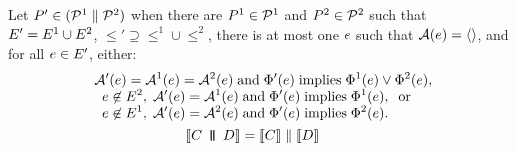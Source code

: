 \begin{definition}
  Let $P' \in (\mathcal{P}^1 \parallel \mathcal{P}^2)$
  when there are $P^1 \in \mathcal{P}^1$ and $P^2 \in \mathcal{P}^2$
  such that
$E' = E^1 \cup E^2$,
${\le'}\supseteq{\le^1}\cup{\le^2}$,
there is at most one $e$ such that $\mathcal{A}(e)=\langle\rangle$,
and for all $e\in E'$,
either:
\begin{gather*}
  \begin{aligned}
    \;\;&\mathcal{A}'(e) = \mathcal{A}^1(e) = \mathcal{A}^2(e) \;\allowbreak\text{and}\allowbreak\; \Phi'(e) \; \allowbreak\text{implies}\allowbreak\; \Phi^1(e) \lor \Phi^2(e),\\[-1ex]
    &\;\;e \not\in E^2,\; \mathcal{A}'(e) = \mathcal{A}^1(e) \;\allowbreak\text{and}\allowbreak\; \Phi'(e) \; \allowbreak\text{implies}\allowbreak\; \Phi^1(e),\; \; \allowbreak\text{or}\allowbreak\;\\[-1ex]
    &\;\;e \not\in E^1,\; \mathcal{A}'(e) = \mathcal{A}^2(e) \;\allowbreak\text{and}\allowbreak\; \Phi'(e) \; \allowbreak\text{implies}\allowbreak\; \Phi^2(e).
  \end{aligned}
  \\
\begin{aligned}
  \llbracket C \,\mathbin{\texttt{\textbf{|}}\mkern-6mu\texttt{\textbf{|}}}\, D\rrbracket & =
  \llbracket C\rrbracket \parallel \llbracket D\rrbracket 
\end{aligned}
\end{gather*}
\end{definition}

